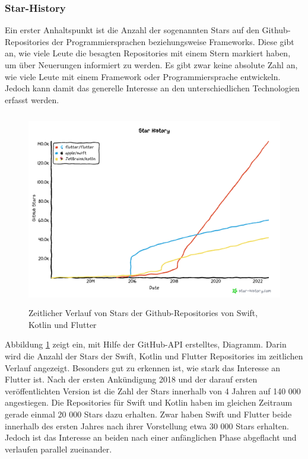 \subsubsection{Star-History}
Ein erster Anhaltspunkt ist die Anzahl der sogenannten Stars auf den Github-Repositories der Programmiersprachen beziehungsweise Frameworks. Diese gibt an, wie viele Leute die besagten Repositories mit einem Stern markiert haben, um über Neuerungen informiert zu werden. Es gibt zwar keine absolute Zahl an, wie viele Leute mit einem Framework oder Programmiersprache entwickeln. Jedoch kann damit das generelle Interesse an den unterschiedlichen Technologien erfasst werden.

\begin{figure}[ht]
  \centering
  \includegraphics[height=8.5cm,keepaspectratio]{images/star-history_programming languages.png} 
  \caption[Zeitlicher Verlauf von Stars der Github-Repositories von Swift, Kotlin und Flutter]{Zeitlicher Verlauf von Stars der Github-Repositories von Swift, Kotlin und Flutter\protect\footnotemark }
  \label{fig:star_history}
\end{figure}



Abbildung \ref{fig:star_history} zeigt ein, mit Hilfe der GitHub-API erstelltes, Diagramm. Darin wird die Anzahl der Stars der Swift, Kotlin und Flutter Repositories im zeitlichen Verlauf angezeigt. 
Besonders gut zu erkennen ist, wie stark das Interesse an Flutter ist. Nach der ersten Ankündigung 2018 und der darauf ersten veröffentlichten Version ist die Zahl der Stars innerhalb von 4 Jahren auf 140 000 angestiegen. Die Repositories für Swift und Kotlin haben im gleichen Zeitraum gerade einmal 20 000 Stars dazu erhalten. Zwar haben Swift und Flutter beide innerhalb des ersten Jahres nach ihrer Vorstellung etwa 30 000 Stars erhalten. Jedoch ist das Interesse an beiden nach einer anfänglichen Phase abgeflacht und verlaufen parallel zueinander.

